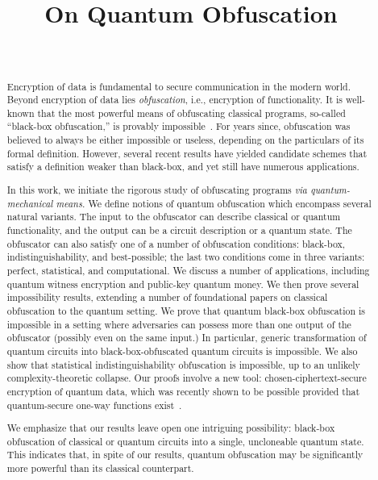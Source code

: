 \documentclass[envcountsame]{llncs}
\title{On Quantum Obfuscation}
\author{~}
\institute{~}
\numberwithin{equation}{section}
\begin{document}
\mainmatter


\maketitle
\thispagestyle{plain}

\begin{abstract}
Encryption of data is fundamental to secure communication in the modern world. Beyond encryption of data lies \emph{obfuscation}, i.e., encryption of functionality. It is well-known that the most powerful means of obfuscating classical programs, so-called ``black-box obfuscation,'' is provably impossible~\cite{BGIRSVY01}. For years since, obfuscation was believed to always be either impossible or useless, depending on the particulars of its formal definition. However, several recent results have yielded candidate schemes that satisfy a definition weaker than black-box, and yet still have numerous applications.

In this work, we initiate the rigorous study of obfuscating programs \emph{via quantum-mechanical means.} We define notions of quantum obfuscation which encompass several natural variants. The input to the obfuscator can describe classical or quantum functionality, and the output can be a circuit description or a quantum state. The obfuscator can also satisfy one of a number of obfuscation conditions: black-box, indistinguishability, and best-possible; the last two conditions come in three variants: perfect, statistical, and computational. We discuss a number of applications, including quantum witness encryption and public-key quantum money. We then prove several impossibility results, extending a number of foundational papers on classical obfuscation to the quantum setting. We prove that quantum black-box obfuscation is impossible in a setting where adversaries can possess more than one output of the obfuscator (possibly even on the same input.) In particular, generic transformation of quantum circuits into black-box-obfuscated quantum circuits is impossible. We also show that statistical indistinguishability obfuscation is impossible, up to an unlikely complexity-theoretic collapse. Our proofs involve a new tool: chosen-ciphertext-secure encryption of quantum data, which was recently shown to be possible provided that quantum-secure one-way functions exist~\cite{ABFGSS16}. 

We emphasize that our results leave open one intriguing possibility: black-box obfuscation of classical or quantum circuits into a single, uncloneable  quantum state. This indicates that, in spite of our results, quantum obfuscation may be significantly more powerful than its classical counterpart.
\end{abstract}
\end{document}
